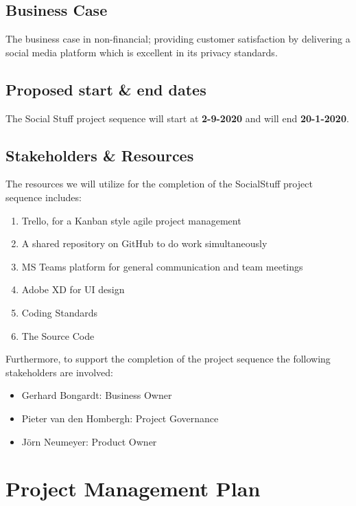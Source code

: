 \subsection{Business Case}

The business case in non-financial;
providing customer satisfaction by delivering a social media platform which is excellent in its privacy standards.

\subsection{Proposed start \& end dates}\label{subsec:proposed-start-and-end-dates}

The Social Stuff project sequence will start at \textbf{2-9-2020} and will end \textbf{20-1-2020}.

\subsection{Stakeholders \& Resources}\label{subsec:stakeholders-and-resources}

The resources we will utilize for the completion of the SocialStuff project sequence includes:
\begin{enumerate}
    \item Trello, for a Kanban style agile project management
    \item A shared repository on GitHub to do work simultaneously
    \item MS Teams platform for general communication and team meetings
    \item Adobe XD for UI design
    \item Coding Standards
    \item The Source Code
\end{enumerate}

Furthermore, to support the completion of the project sequence the following stakeholders are involved:
\begin{itemize}
    \item Gerhard Bongardt: Business Owner
    \item Pieter van den Hombergh: Project Governance
    \item Jörn Neumeyer: Product Owner
\end{itemize}


\section{Project Management Plan}\label{sec:project-management-plan}

